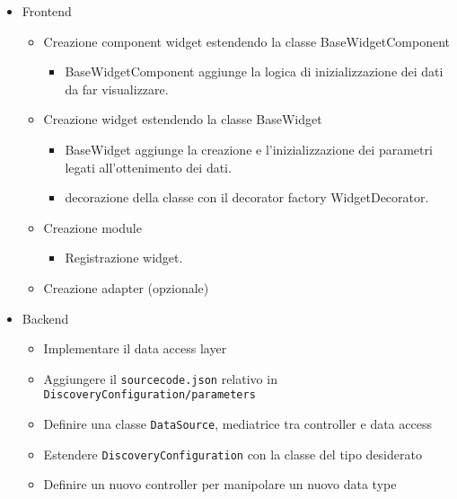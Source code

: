 \begin{itemize}
    \item Frontend
\begin{itemize}
    \item Creazione component widget estendendo la classe BaseWidgetComponent
    \begin{itemize}
        \item BaseWidgetComponent aggiunge la logica di inizializzazione dei dati da far visualizzare.
    \end{itemize}
    \item Creazione widget estendendo la classe BaseWidget
    \begin{itemize}
        \item BaseWidget aggiunge la creazione e l'inizializzazione dei parametri legati all'ottenimento dei dati.
        \item decorazione della classe con il decorator factory WidgetDecorator.
    \end{itemize}
    \item Creazione module
    \begin{itemize}
        \item Registrazione widget.
    \end{itemize}
    \item Creazione adapter (opzionale)
\end{itemize}
\item Backend
\begin{itemize}
	\item Implementare il data access layer
	\item Aggiungere il \verb|sourcecode.json| relativo in \verb|DiscoveryConfiguration/parameters|
	\item Definire una classe \verb|DataSource|, mediatrice tra controller e data access
	\item Estendere \verb|DiscoveryConfiguration| con la classe del tipo desiderato
	\item Definire un nuovo controller per manipolare un nuovo data type
\end{itemize}
\end{itemize}
